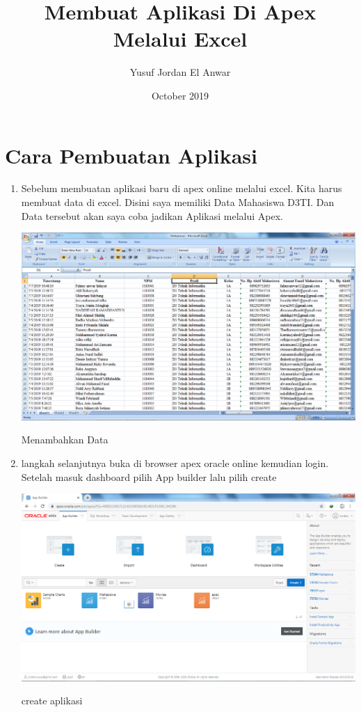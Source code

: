 \documentclass{article}
\title{Membuat Aplikasi Di Apex Melalui Excel}
\author{Yusuf Jordan El Anwar }
\date{October 2019}
\begin{document}
\maketitle

\section{ Cara Pembuatan Aplikasi}

\begin{enumerate}
    \item Sebelum membuatan aplikasi baru di apex online melalui excel. Kita harus membuat data di excel. Disini saya memiliki Data Mahasiswa D3TI. Dan Data tersebut akan saya coba jadikan Aplikasi melalui Apex.  
    \begin{center}
         \centering
            \includegraphics[scale=0.27]{figures/DB0.png}
        \caption{Menambahkan Data}
        \label{excel}
    \end{center}
       
     \item langkah selanjutnya buka di browser apex oracle online kemudian login. Setelah masuk dashboard pilih App builder lalu pilih create
    \begin{center}
         \centering
            \includegraphics[scale=0.27]{figures/DB1.png}
        \caption{create aplikasi}
        \label{create}
    \end{center}
    

\end{enumerate}
\end{document}
